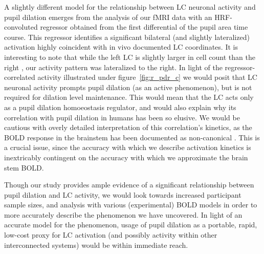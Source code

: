 	    A slightly different model for the relationship between LC neuronal activity and pupil dilation emerges from the analysis of our fMRI data with an HRF-convoluted regressor obtained from the first differential of the pupil area time course.
	    This regressor identifies a significant bilateral (and slightly lateralized) activation highly coincident with in vivo documented LC coordinates.
	    It is interesting to note that while the left LC is slightly larger in cell count than the right \citep{Mouton1994}, our activity pattern was lateralized to the right.
	    In light of the regressor-correlated activity illustrated under figure~\ref{fig:r_pdr_c} we would posit that LC neuronal activity prompts pupil dilation (as an active phenomenon), but is not required for dilation level maintenance.
	    This would mean that the LC acts only as a pupil dilation homoeostasis regulator, and would also explain why its correlation with pupil dilation in humans has been so elusive.
	    We would be cautious with overly detailed interpretation of this correlation's kinetics, as the BOLD response in the brainstem has been documented as non-canonical \citep{Astafiev2010}.
	    This is a crucial issue, since the accuracy with which we describe activation kinetics is inextricably contingent on the accuracy with which we approximate the brain stem BOLD.
	    
	    Though our study provides ample evidence of a significant relationship between pupil dilation and LC activity, we would look towards increased participant sample sizes, and analysis with various (experimental) BOLD models in order to more accurately describe the phenomenon we have uncovered.
	    In light of an accurate model for the phenomenon, usage of pupil dilation as a portable, rapid, low-cost proxy for LC activation (and possibly activity within other interconnected systems) would be within immediate reach.
